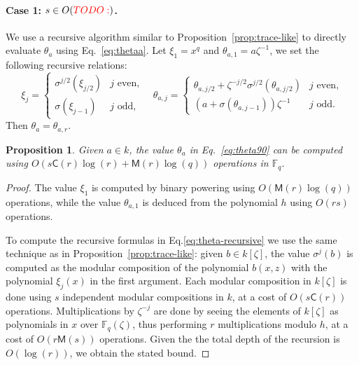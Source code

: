 \documentclass[12pt]{article}
\theoremstyle{plain}
\newtheorem{proposition}[theorem]{Proposition}
\theoremstyle{definition}
\newcommand{\todo}[1]{\textcolor{red}{TODO: #1}}
\def\F{\ensuremath{\mathbb{F}}}
\def\MM{\ensuremath{\mathsf{M}}}
\def\CC{\ensuremath{\mathsf{C}}}
\newcounter{algorithm}
\begin{document}
\paragraph{Case 1: $s\in O(\todo{})$.}
We use a recursive algorithm similar to Proposition~\ref{prop:trace-like}
to directly evaluate $\theta_a$ using Eq.~\eqref{eq:thetaa}.
Let $\xi_1=x^q$ and $\theta_{a,1}=a\zeta^{-1}$,
we set the following recursive relations:
\begin{equation}
\label{eq:theta-recursive}
\xi_j = 
\begin{cases}
\sigma^{j/2}(\xi_{j / 2}) & j \text{ even,} \\
\sigma(\xi_{j - 1}) & j \text{ odd,}
\end{cases} \quad
\theta_{a, j} = 
\begin{cases}
\theta_{a, j / 2} + \zeta^{-j / 2}\sigma^{j / 2}(\theta_{a, j / 2})& j \text{ even,} \\
(a + \sigma(\theta_{a, j - 1}))\zeta^{-1} & j \text{ odd.}
\end{cases}
\end{equation}
Then $\theta_a=\theta_{a,r}$.

\begin{proposition}
  \label{prop:xitheta}
  Given $a\in k$, the value $\theta_a$ in Eq.~\eqref{eq:theta90} can
  be computed using $O(s\CC(r)\log(r)+\MM(r)\log(q))$ operations in
  $\F_q$.
\end{proposition}
\begin{proof}
  The value $\xi_1$ is computed by binary powering using
  $O(\MM(r)\log(q))$ operations, while the value $\theta_{a,1}$ is
  deduced from the polynomial $h$ using $O(rs)$ operations.
  
  To compute the recursive formulas in Eq.\eqref{eq:theta-recursive}
  we use the same technique as in Proposition~\ref{prop:trace-like}:
  given $b \in k[\zeta]$, the value $\sigma^j(b)$ is computed as the
  modular composition of the polynomial $b(x,z)$ with the polynomial
  $\xi_j(x)$ in the first argument. %
  Each modular composition in $k[\zeta]$ is done using $s$ independent
  modular compositions in $k$, at a cost of $O(s\CC(r))$ operations. %
  Multiplications by $\zeta^{-j}$ are done by seeing the elements of
  $k[\zeta]$ as polynomials in $x$ over $\F_q(\zeta)$, thus performing
  $r$ multiplications modulo $h$, at a cost of $O(r\MM(s))$
  operations. %
  Given the the total depth of the recursion is $O(\log(r))$, we
  obtain the stated bound.
\end{proof}
\end{document}
